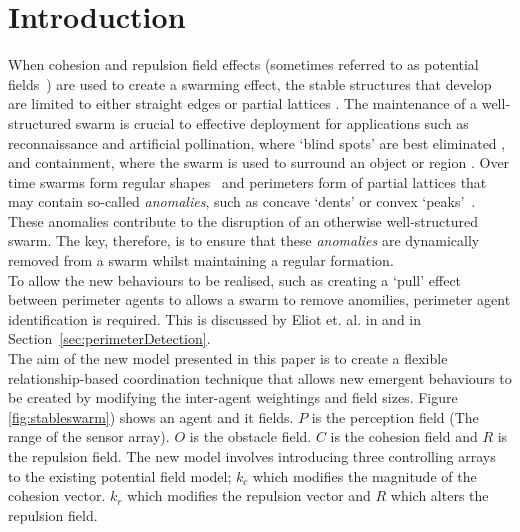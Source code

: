 \documentclass[12pt,a4paper]{IEEEtran}
\newcommand{\kc}{\mathit{k_{c}}}
\newcommand{\kr}{\mathit{k_{r}}}
\newcommand{\rb}{\mathit{R}}
\begin{document}
\section{Introduction}
When cohesion and repulsion field effects (sometimes referred to as potential fields~\cite{BAF:06,eliot2018metric,VG:05,liang2019swarm,SW:03,Son2017}) are used to create a swarming effect, the stable structures that develop are limited to either straight edges or partial lattices \cite{eliot2017methods}. The maintenance of a well-structured swarm is crucial to effective deployment for applications such as reconnaissance and artificial pollination, where `blind spots' are best eliminated \cite{elamvazhuthi2015optimal}, and containment, where the swarm is used to surround an object or region \cite{cao2012distributed}. Over time swarms form regular shapes~\cite{RAZ:13} and perimeters form of partial lattices that may contain so-called \textit{anomalies}, such as concave `dents' or convex `peaks'~\cite{eliot2019void}. These anomalies contribute to the disruption of an otherwise well-structured swarm. The key, therefore, is to ensure that these \textit{anomalies} are dynamically removed from a swarm whilst maintaining a regular formation.\\
To allow the new behaviours to be realised, such as creating a `pull' effect between perimeter agents to allows a swarm to remove anomilies, perimeter agent identification is required. This is discussed by Eliot et. al. in \cite{eliot2017methods, eliot2018metric, eliot2019void} and in Section~\ref{sec:perimeterDetection}.\\
The aim of the new model presented in this paper is to create a flexible relationship-based coordination technique that allows new emergent behaviours to be created by modifying the inter-agent weightings and field sizes. Figure \ref{fig:stableswarm}) shows an agent and it fields. $P$ is the perception field (The range of the sensor array). $O$ is the obstacle field. $C$ is the cohesion field and $\rb$ is the repulsion field. The new model involves introducing three controlling arrays to the existing potential field model; $\kc$ which modifies the magnitude of the cohesion vector. $\kr$ which modifies the repulsion vector and $\rb$ which alters the repulsion field.\\
\end{document}
